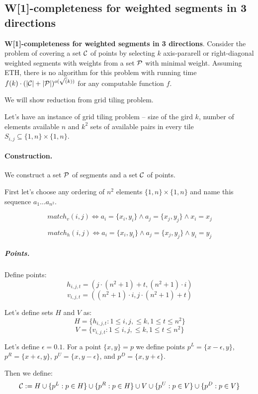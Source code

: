 \subsection{W[1]-completeness for weighted segments in 3 directions}

\begin{tw}
	\textbf{W[1]-completeness for weighted segments in 3 directions}.
	Consider the problem of covering a set $\mathcal{C}$ of points
	by selecting $k$ axis-pararell or right-diagonal weighted segments
	with weights
	from a set $\mathcal{P}$ with minimal weight.
	Assuming ETH, there is no algorithm for this
	problem with running time
	$f(k)\cdot(|\mathcal{C}| + |\mathcal{P}|)^{o(\sqrt(k))}$
	for any computable function $f$.
\end{tw}

We will show reduction from grid tiling problem.


Let's have an instance of grid tiling problem -- size of the
gird $k$, number of elements available $n$
and $k^2$ sets of available pairs in every tile
$S_{i, j} \subseteq \{1,n\} \times \{1,n\}$.

\paragraph{Construction.}
We construct a set $\mathcal{P}$ of segments and a set $\mathcal{C}$
of points.

First let's choose any ordering of $n^2$ elements
$\{1,n\} \times \{1,n\}$ and name this sequence $a_1 \ldots a_{n^2}$.

$$match_v(i, j) \iff
a_i = \{x_i, y_i\} \land a_j = \{x_j, y_j\} \land x_i = x_j$$

$$match_h(i, j) \iff
a_i = \{x_i, y_i\} \land a_j = \{x_j, y_j\} \land y_i = y_j$$


\subparagraph{Points.}

Define points:
	$$h_{i, j, t} = (j \cdot (n^2+1) + t, (n^2+1) \cdot i)$$
	$$v_{i, j, t} = ((n^2+1) \cdot i, j \cdot (n^2+1) + t)$$
	
Let's define sets $H$ and $V$ as:
$$H = \{h_{i, j, t} : 1 \le i, j, \le k, 1 \le t \le n^2\}$$
$$V = \{v_{i, j, t} : 1 \le i, j, \le k, 1 \le t \le n^2\}$$
	
Let's define $\epsilon = 0.1$.
For a point $\{x, y\} = p$ we define points
$p^{L} = \{x - \epsilon, y\}$,
$p^{R} = \{x + \epsilon, y\}$,
$p^{U} = \{x, y - \epsilon\}$,
and $p^{D} = \{x, y + \epsilon\}$.

Then we define:
$$\mathcal{C} := H \cup \{p^L : p \in H\} \cup \{p^R : p \in H\}
\cup V \cup \{p^U : p \in V\} \cup \{p^D : p \in V\} $$


